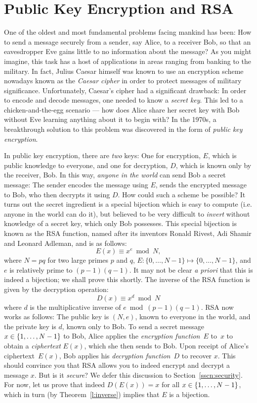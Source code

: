 \documentclass[11pt]{article}
\begin{document}
\section{Public Key Encryption and RSA}

One of the oldest and most fundamental problems facing mankind has been: How to send a message securely from a sender, say Alice, to a receiver Bob, so that an eavesdropper Eve gains little to no information about the message? As you might imagine, this task has a host of applications in areas ranging from banking to the military. In fact, Julius Caesar himself was known to use an encryption scheme nowadays known as the \emph{Caesar cipher} in order to protect messages of military significance. Unfortunately, Caesar's cipher had a significant drawback: In order to encode and decode messages, one needed to know a \emph{secret key}. This led to a chicken-and-the-egg scenario --- how does Alice share her secret key with Bob without Eve learning anything about it to begin with? In the 1970s, a breakthrough solution to this problem was discovered in the form of \emph{public key encryption}.

In public key encryption, there are \emph{two} keys: One for encryption, $E$, which is public knowledge to everyone, and one for decryption, $D$, which is known only by the receiver, Bob. In this way, \emph{anyone in the world} can send Bob a secret message: The sender encodes the message using $E$, sends the encrypted message to Bob, who then decrypts it using $D$. How could such a scheme be possible? It turns out the secret ingredient is a special bijection which is easy to compute (i.e. anyone in the world can do it), but believed to be very difficult to \emph{invert} without knowledge of a secret key, which only Bob possesses. This special bijection is known as the RSA function, named after its inventors Ronald Rivest, Adi Shamir and Leonard Adleman, and is as follows:
\[
E(x) \equiv x^e \bmod N,
\]
where $N= pq$ for two large primes $p$ and $q$, $E: \{0,\dots,N-1\}\mapsto\{0,\dots,N-1\}$,
and $e$ is relatively prime to $(p-1)(q-1)$. It may not be clear \emph{a priori} that this is indeed a bijection; we shall prove this shortly. The inverse of the RSA function is given by the decryption operation:
\[
	D(x) \equiv x^d \bmod N
\]
where $d$ is the multiplicative inverse of $e\bmod (p-1)(q-1)$. RSA now works as follows: The public key is $(N,e)$, known to everyone in the world, and the private key is $d$, known only to Bob. To send a secret message $x\in{\left\{1,\ldots,N-1\right\}}$ to Bob, Alice applies the {\it encryption function}~$E$ to~$x$ to obtain a {\it ciphertext} $E(x)$, which she then sends to Bob. Upon receipt of Alice's ciphertext~$E(x)$, Bob applies his {\it decryption function\/}~$D$ to recover $x$. This should convince you that RSA allows you to indeed encrypt and decrypt a message $x$. But is it \emph{secure}? We defer this discussion to Section~\ref{sscn:security}. For now, let us prove that indeed $D(E(x)) = x$ for all $x\in{\left\{1,\ldots, N-1\right\}}$, which in turn (by Theorem~\ref{l:inverse}) implies that $E$ is a bijection.
\end{document}
